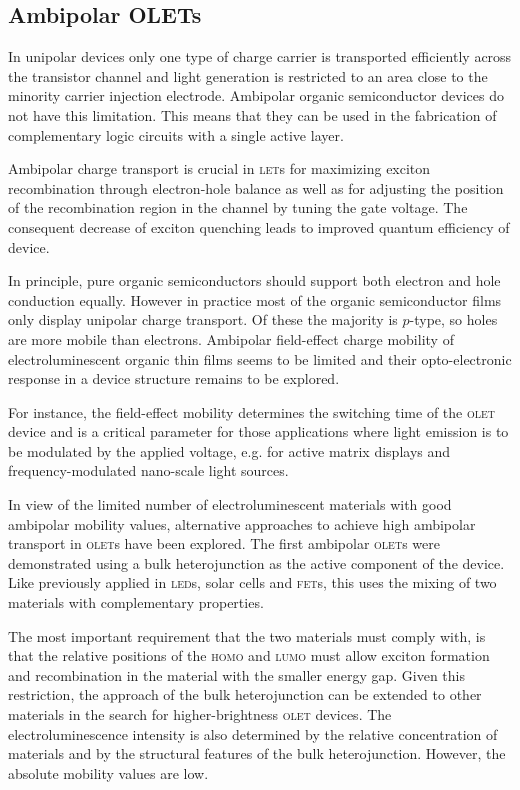 \subsection{Ambipolar OLETs} %
In unipolar devices only one type of charge carrier is transported efficiently across the transistor channel and light generation is restricted to an area close to the minority carrier injection electrode. Ambipolar organic semiconductor devices do not have this limitation. This means that they can be used in the fabrication of complementary logic circuits with a single active layer.

Ambipolar charge transport is crucial in \textsc{let}s for maximizing exciton recombination through electron-hole balance as well as for adjusting the position of the recombination region in the channel by tuning the gate voltage. The consequent decrease of exciton quenching leads to improved quantum efficiency of device.

In principle, pure organic semiconductors should support both electron and hole conduction equally. However in practice most of the organic semiconductor films only display unipolar charge transport. Of these the majority is $p$-type, so holes are more mobile than electrons. Ambipolar field-effect charge mobility of electroluminescent organic thin films seems to be limited and their opto-electronic response in a device structure remains to be explored.

For instance, the field-effect mobility determines the switching time of the \textsc{olet} device and is a critical parameter for those applications where light emission is to be modulated by the applied voltage, e.g. for active matrix displays and frequency-modulated nano-scale light sources.

In view of the limited number of electroluminescent materials with good ambipolar mobility values, alternative approaches to achieve high ambipolar transport in \textsc{olet}s have been explored. The first ambipolar \textsc{olet}s were demonstrated using a bulk heterojunction as the active component of the device. Like previously applied in \textsc{led}s, solar cells and \textsc{fet}s, this uses the mixing of two materials with complementary properties.

The most important requirement that the two materials must comply with, is that the relative positions of the \textsc{homo} and \textsc{lumo} must allow exciton formation and recombination in the material with the smaller energy gap. Given this restriction, the approach of the bulk heterojunction can be extended to other materials in the search for higher-brightness \textsc{olet} devices. The electroluminescence intensity is also determined by the relative concentration of materials and by the structural features of the bulk heterojunction. However, the absolute mobility values are low.

